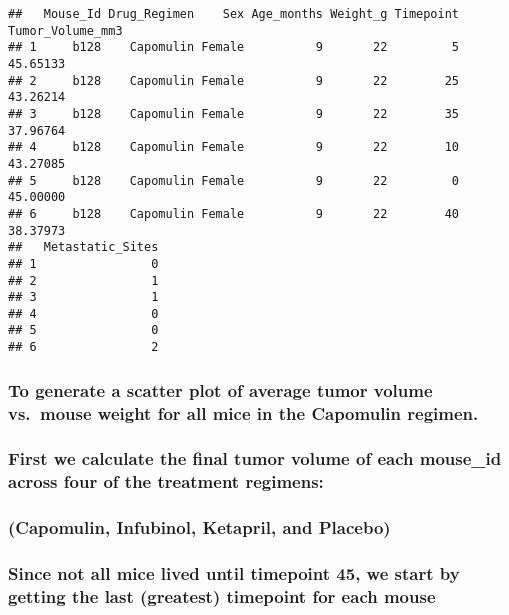 \documentclass[
]{article}
\begin{document}
\begin{verbatim}
##   Mouse_Id Drug_Regimen    Sex Age_months Weight_g Timepoint Tumor_Volume_mm3
## 1     b128    Capomulin Female          9       22         5         45.65133
## 2     b128    Capomulin Female          9       22        25         43.26214
## 3     b128    Capomulin Female          9       22        35         37.96764
## 4     b128    Capomulin Female          9       22        10         43.27085
## 5     b128    Capomulin Female          9       22         0         45.00000
## 6     b128    Capomulin Female          9       22        40         38.37973
##   Metastatic_Sites
## 1                0
## 2                1
## 3                1
## 4                0
## 5                0
## 6                2
\end{verbatim}

\hypertarget{to-generate-a-scatter-plot-of-average-tumor-volume-vs.-mouse-weight-for-all-mice-in-the-capomulin-regimen.}{%
\subsubsection{To generate a scatter plot of average tumor volume
vs.~mouse weight for all mice in the Capomulin
regimen.}\label{to-generate-a-scatter-plot-of-average-tumor-volume-vs.-mouse-weight-for-all-mice-in-the-capomulin-regimen.}}

\hypertarget{first-we-calculate-the-final-tumor-volume-of-each-mouse_id-across-four-of-the-treatment-regimens}{%
\subsubsection{First we calculate the final tumor volume of each
mouse\_id across four of the treatment
regimens:}\label{first-we-calculate-the-final-tumor-volume-of-each-mouse_id-across-four-of-the-treatment-regimens}}

\hypertarget{capomulin-infubinol-ketapril-and-placebo}{%
\subsubsection{(Capomulin, Infubinol, Ketapril, and
Placebo)}\label{capomulin-infubinol-ketapril-and-placebo}}

\hypertarget{since-not-all-mice-lived-until-timepoint-45-we-start-by-getting-the-last-greatest-timepoint-for-each-mouse}{%
\subsubsection{Since not all mice lived until timepoint 45, we start by
getting the last (greatest) timepoint for each
mouse}\label{since-not-all-mice-lived-until-timepoint-45-we-start-by-getting-the-last-greatest-timepoint-for-each-mouse}}
\end{document}
